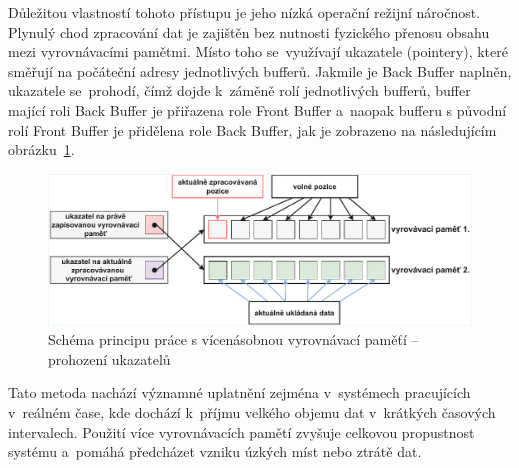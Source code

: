 Důležitou vlastností tohoto přístupu je jeho nízká operační režijní náročnost. Plynulý chod zpracování dat je zajištěn bez nutnosti fyzického přenosu obsahu mezi vyrovnávacími pamětmi. Místo toho se~využívají ukazatele (pointery), které směřují na počáteční adresy jednotlivých bufferů. Jakmile je Back Buffer naplněn, ukazatele se~prohodí, čímž dojde k~záměně rolí jednotlivých bufferů, buffer mající roli Back Buffer je přiřazena role Front Buffer a~naopak bufferu s původní rolí Front Buffer je přidělena role Back Buffer, jak je zobrazeno na následujícím obrázku~\ref{fig:multiple-buffering-2}.~\cite{multiple_buffering_batch_saving, double_buffering_model}

\begin{figure}[h]
    \centering
    \includegraphics[width=1.00\textwidth]{obrazky-figures/multiple_buffering-2-2.pdf}
    
    \caption{Schéma principu práce s vícenásobnou vyrovnávací paměťí -- prohození ukazatelů}
    \label{fig:multiple-buffering-2}
\end{figure}

\newpage

Tato metoda nachází významné uplatnění zejména v~systémech pracujících v~reálném čase, kde dochází k~příjmu velkého objemu dat v~krátkých časových intervalech. Použití více vyrovnávacích pamětí zvyšuje celkovou propustnost systému a~pomáhá předcházet vzniku úzkých míst nebo ztrátě dat. ~\cite{multiple_buffering_batch_saving, double_buffering_model}

